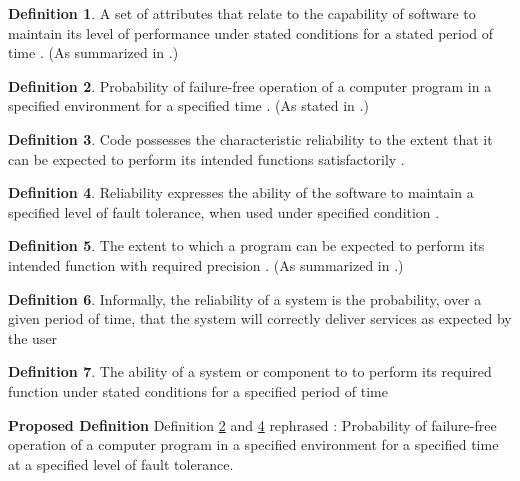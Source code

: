 \documentclass[letterpaper,cleveref]{lipics-v2019}
\theoremstyle{definition}
\newtheorem{defn}{Definition}
\begin{document}
\begin{defn}
	A set of attributes that relate to the capability of software to maintain its
	level of performance under stated conditions for a stated period of time \citep{iso2001iec}. (As summarized in \citet{berander2005software}.)
\end{defn}

\begin{defn} \label{reliabilitySelected1}
	Probability of failure-free operation of a computer program in a specified environment for a specified time \citep{musa1987software}. (As stated in \citet{pressman2005software}.)
\end{defn}

\begin{defn}
	Code possesses the characteristic reliability to the extent that it can be
	expected to perform its intended functions satisfactorily
	\citep{boehm1976quantitative}.
\end{defn}

\begin{defn} \label{reliabilitySelected2}
   Reliability expresses the ability of the software to maintain a specified
   level of fault tolerance, when used under specified condition \citep{singh2013different}.
\end{defn}
\begin{defn}
	The extent to which a program can be expected to perform its intended
	function with required precision \citep{McCallEtAl1977}. (As summarized in
    \citet{VanVliet2000}.)
\end{defn}

\begin{defn}
	Informally, the reliability of a system is the probability, over a given
	period of time, that the system will correctly deliver services as expected by
	the user \citep{sommerville}
\end{defn}
	
\begin{defn}
	The ability of a system or component to to perform its required function under stated conditions for a specified period of time \citep{IEEEComputerDictionary1991}
\end{defn}


\noindent \textbf{Proposed Definition}
Definition \ref{reliabilitySelected1} and \ref{reliabilitySelected2} rephrased : 	Probability of failure-free operation of a computer program in a specified environment for a specified time at a specified level of fault tolerance.
\end{document}

